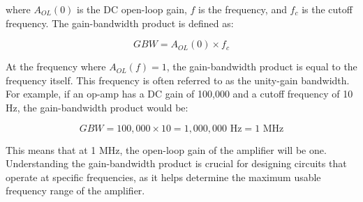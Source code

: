 where \( A_{OL}(0) \) is the DC open-loop gain, \( f \) is the frequency, and \( f_c \) is the cutoff frequency. The gain-bandwidth product is defined as:

\[
GBW = A_{OL}(0) \times f_c
\]

At the frequency where \( A_{OL}(f) = 1 \), the gain-bandwidth product is equal to the frequency itself. This frequency is often referred to as the unity-gain bandwidth. For example, if an op-amp has a DC gain of 100,000 and a cutoff frequency of 10 Hz, the gain-bandwidth product would be:

\[
GBW = 100,000 \times 10 = 1,000,000 \text{ Hz} = 1 \text{ MHz}
\]

This means that at 1 MHz, the open-loop gain of the amplifier will be one. Understanding the gain-bandwidth product is crucial for designing circuits that operate at specific frequencies, as it helps determine the maximum usable frequency range of the amplifier.

